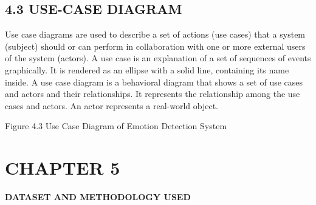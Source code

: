 \documentclass[12pt]{report}
\begin{document}
\subsection*{4.3 USE-CASE DIAGRAM}
\begin{center}
    \justify
Use case diagrams are used to describe a set of actions (use cases) that a system (subject) should or can perform in collaboration with one or more external users of the system (actors).
\noindent A use case is an explanation of a set of sequences of events graphically. It is rendered as an ellipse with a solid line, containing its name inside.
\noindent A use case diagram is a behavioral diagram that shows a set of use cases and actors and their relationships. It represents the relationship among the use cases and actors. An actor represents a real-world object.
\end{center}
\vspace{1em}
\begin{figure}[h]
\centering
{}
\end{figure}
\begin{center}
    Figure 4.3 Use Case Diagram of Emotion Detection System
\end{center}


\newpage
\section*{CHAPTER 5}
\vspace{1EM}
\begin{center}
    \textbf{\fontsize{16pt}{21.6pt}\selectfont DATASET AND METHODOLOGY USED}  %
\end{center}
\end{document}
